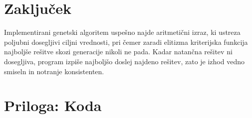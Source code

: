 \documentclass[a4paper, 11pt]{article}
\begin{document}
\section{Zaključek}
Implementirani genetski algoritem uspešno najde aritmetični izraz, ki ustreza poljubni dosegljivi ciljni vrednosti, pri čemer zaradi elitizma kriterijska funkcija najboljše rešitve skozi generacije nikoli ne pada. Kadar natančna rešitev ni dosegljiva, program izpiše najboljšo doslej najdeno rešitev, zato je izhod vedno smiseln in notranje konsistenten.

\newpage
\section*{Priloga: Koda}

\end{document}
